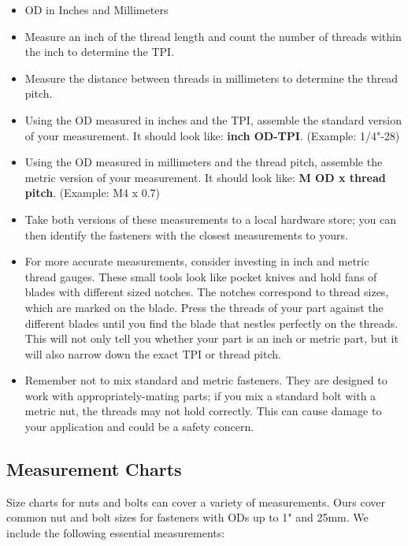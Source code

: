 \documentclass[english,]{article}
\providecommand{\tightlist}{%
  \setlength{\itemsep}{0pt}\setlength{\parskip}{0pt}}
\begin{document}
\begin{itemize}
\tightlist
\item
  OD in Inches and Millimeters
\item
  Measure an inch of the thread length and count the number of threads
  within the inch to determine the TPI.
\item
  Measure the distance between threads in millimeters to determine the
  thread pitch.
\item
  Using the OD measured in inches and the TPI, assemble the standard
  version of your measurement. It should look like: \textbf{inch
  OD-TPI}. (Example: 1/4"-28)
\item
  Using the OD measured in millimeters and the thread pitch, assemble
  the metric version of your measurement. It should look like: \textbf{M
  OD x thread pitch}. (Example: M4 x 0.7)
\item
  Take both versions of these measurements to a local hardware store;
  you can then identify the fasteners with the closest measurements to
  yours.
\item
  For more accurate measurements, consider investing in inch and metric
  thread gauges. These small tools look like pocket knives and hold fans
  of blades with different sized notches. The notches correspond to
  thread sizes, which are marked on the blade. Press the threads of your
  part against the different blades until you find the blade that
  nestles perfectly on the threads. This will not only tell you whether
  your part is an inch or metric part, but it will also narrow down the
  exact TPI or thread pitch.
\item
  Remember not to mix standard and metric fasteners. They are designed
  to work with appropriately-mating parts; if you mix a standard bolt
  with a metric nut, the threads may not hold correctly. This can cause
  damage to your application and could be a safety concern.
\end{itemize}

\hypertarget{iz6h0v3}{%
\subsection{Measurement Charts}\label{iz6h0v3}}

\hypertarget{idtx4l}{}
Size charts for nuts and bolts can cover a variety of measurements. Ours
cover common nut and bolt sizes for fasteners with ODs up to 1" and
25mm. We include the following essential measurements:
\end{document}
